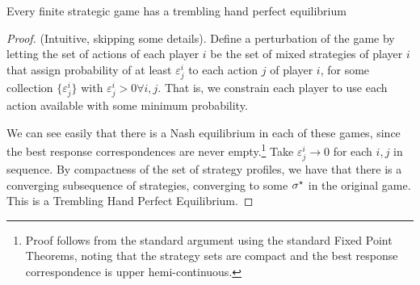 \documentclass[10pt]{article}
\begin{document}
\begin{proposition}
	Every finite strategic game has a trembling hand perfect equilibrium
\end{proposition}
\begin{proof} 
	(Intuitive, skipping some details). Define a perturbation of the game by letting the set of actions of each player $i$ be the set of mixed strategies of player $i$ that assign probability of at least $\varepsilon_j^i$ to each action $j$ of player $i$, for some collection $\{\varepsilon_j^i\}$ with $\varepsilon_j^i > 0 \forall i,j$. That is, we constrain each player to use each action available with some minimum probability.
	
	We can see easily that there is a Nash equilibrium in each of these games, since the best response correspondences are never empty.\footnote{Proof follows from the standard argument using the standard Fixed Point Theorems, noting that the strategy sets are compact and the best response correspondence is upper hemi-continuous.} Take $\varepsilon_j^i \to 0$ for each $i,j$ in sequence. By compactness of the set of strategy profiles, we have that there is a converging subsequence of strategies, converging to some $\sigma^\star$ in the original game. This is a Trembling Hand Perfect Equilibrium.
\end{proof}
\end{document}
